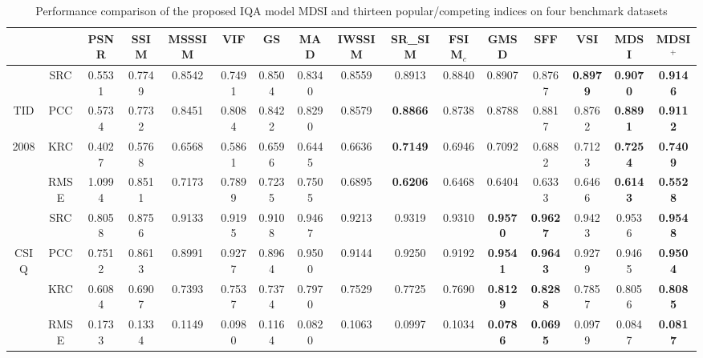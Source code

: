 \begin{table*}[htb]
\caption{Performance comparison of the proposed IQA model MDSI and thirteen popular/competing indices on four benchmark datasets}
\scriptsize
\centering
\begin{tabular}{cccccccccccccccc}
\hline
                      &      & PSNR   & SSIM   & MSSSIM & VIF    & GS     & MAD             & IWSSIM & SR\_SIM         & FSIM$_c$           & GMSD            & SFF             & VSI             & MDSI             & MDSI$^+$                \\ \hline
                      & SRC  & 0.5531 & 0.7749 & 0.8542 & 0.7491 & 0.8504 & 0.8340          & 0.8559 & 0.8913 & 0.8840          & 0.8907          & 0.8767          & \textbf{0.8979} & \textbf{0.9070} & \textbf{0.9146}\\
TID                   & PCC  & 0.5734 & 0.7732 & 0.8451 & 0.8084 & 0.8422 & 0.8290          & 0.8579 & \textbf{0.8866} & 0.8738          & 0.8788          & 0.8817 & 0.8762          & \textbf{0.8891} & \textbf{0.9112}\\
2008                  & KRC  & 0.4027 & 0.5768 & 0.6568 & 0.5861 & 0.6596 & 0.6445          & 0.6636 & \textbf{0.7149} & 0.6946          & 0.7092          & 0.6882          & 0.7123 & \textbf{0.7254} & \textbf{0.7409}\\
                      & RMSE & 1.0994 & 0.8511 & 0.7173 & 0.7899 & 0.7235 & 0.7505          & 0.6895 & \textbf{0.6206} & 0.6468          & 0.6404          & 0.6333 & 0.6466          & \textbf{0.6143} & \textbf{0.5528}\\ \hline
                      & SRC  & 0.8058 & 0.8756 & 0.9133 & 0.9195 & 0.9108 & 0.9467          & 0.9213 & 0.9319          & 0.9310          & \textbf{0.9570} & \textbf{0.9627} & 0.9423          & 0.9536 & \textbf{0.9548}\\
\multirow{2}{*}{CSIQ} & PCC  & 0.7512 & 0.8613 & 0.8991 & 0.9277 & 0.8964 & 0.9500 & 0.9144 & 0.9250          & 0.9192          & \textbf{0.9541} & \textbf{0.9643} & 0.9279          & 0.9465 & \textbf{0.9504}         \\
                      & KRC  & 0.6084 & 0.6907 & 0.7393 & 0.7537 & 0.7374 & 0.7970          & 0.7529 & 0.7725          & 0.7690          & \textbf{0.8129} & \textbf{0.8288} & 0.7857          & 0.8056 & \textbf{0.8085}\\
                      & RMSE & 0.1733 & 0.1334 & 0.1149 & 0.0980 & 0.1164 & 0.0820 & 0.1063 & 0.0997          & 0.1034          & \textbf{0.0786} & \textbf{0.0695} & 0.0979          & 0.0847 & \textbf{0.0817}         \\ \hline

\end{tabular}
\end{table*}
